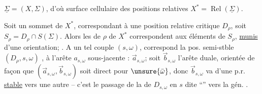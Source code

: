$\underline{\Sigma}=(X,\Sigma)$, d'où surface cellulaire des positions relatives $X^*=\operatorname{Rel}(\underline{\Sigma})$.

Soit un sommet \inserted{$\rho$} de $X^*$, correspondant à une position relative critique \deleted{$\unsure{\Delta}$}$D_{\rho}$, soit $S_{\rho}=D_{\rho}\cap S(\Sigma)$.
Alors les  de $\rho$ de $X^*$ correspondent aux  éléments  de $S_{\rho}$, \uline{munis} d'une orientation; .
A un tel couple $(s,\omega)$, correspond la pos. semi-stble $(D_{\rho},s,\omega)$  ,
à l'arête $a_{s,\omega}$ sous-jacente : $\vec a_{s,\omega}$; soit $\vec b_{s,\omega}$ l'arête duale, orientée de façon que $(\vec a_{s,\omega},\vec b_{s,\omega})$ soit direct pour $\unsure{\bar\omega}$, donc $\vec b_{s,\omega}$ va d'une p.r. \uline{stable} vers une autre -- c'est le passage de la  de $D_{s,\omega}$ en $s$ dite ``'' vers la gén.  .
